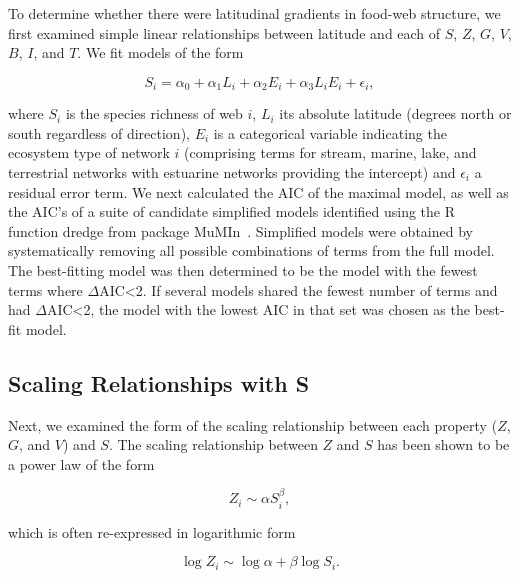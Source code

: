 \documentclass[12pt]{article}
\begin{document}
  To determine whether there were latitudinal gradients in food-web structure,
  we first examined simple linear relationships between latitude and each of 
  $S$, $Z$, $G$, $V$, $B$, $I$, and $T$. We fit models of the form

  \begin{equation}
  \label{Latfull}
  S_{i} = \alpha_{0} + \alpha_{1} L_{i} + \alpha_{2} E_{i} + \alpha_{3} L_{i} E_{i} + \epsilon_{i} ,
  \end{equation}

  \noindent where $S_{i}$ is the species richness of web $i$, $L_{i}$ its absolute
  latitude (degrees north or south  regardless of direction), $E_{i}$ is a categorical
  variable indicating the ecosystem type of network $i$ (comprising terms for stream, 
  marine, lake, and terrestrial networks with estuarine
  networks providing the intercept) and $\epsilon_{i}$ a residual error term. 
  We next calculated the AIC
  of the maximal model, as well as the AIC's of a suite of candidate simplified models identified
  using the R~\citep{R} function dredge from package MuMIn~\citep{MuMIn}. 
  Simplified models were obtained by
  systematically removing all possible combinations of terms from the full model.
  The best-fitting model was then determined to be the model with the fewest terms 
  where $\Delta$AIC\textless2. If several models shared the fewest number of terms 
  and had $\Delta$AIC\textless2, the model with the lowest AIC in that set was chosen as the best-fit
  model.


\subsection*{Scaling Relationships with S}

  Next, we examined the form of the scaling relationship between each 
  property ($Z$, $G$, and $V$) and $S$. The scaling relationship between $Z$ and 
  $S$ has been shown to be a power law \citep{Riede2010} of the form 

  \begin{equation}
  \label{Power}
  Z_{i} \sim \alpha S_{i}^{\beta}  ,
  \end{equation}

  \noindent which is often re-expressed in logarithmic form 

  \begin{equation}
  \label{Loglog}
  \log{Z_{i}} \sim \log{\alpha} + \beta\log{S_{i}}  .
  \end{equation}
\end{document}
